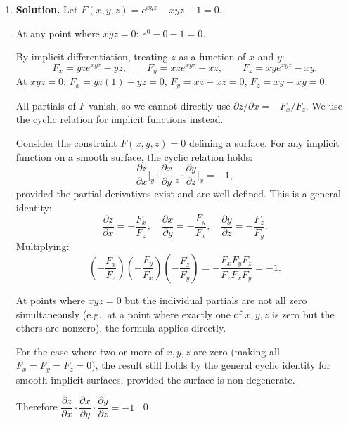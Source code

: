 \begin{enumerate}
\textbf{Second derivative:} Let $y' = \dfrac{2x + y\cos(xy)}{1 - x\cos(xy)}$. Differentiating the original equation $y - x^2 = \sin(xy)$ implicitly again:

$y' - 2x = \cos(xy)(y + xy')$. At $(0,0)$ with $y' = 0$:
$0 - 0 = \cos(0)(0 + 0) = 0$.

Differentiating once more: $y'' - 2 = -\sin(xy)(y+xy')^2 + \cos(xy)(y' + y' + xy'') $.

At $(0,0)$: $y'' - 2 = 0 + \cos(0)(0 + 0 + 0) = 0$.

Therefore $\dfrac{d^2y}{dx^2}\Big|_{(0,0)} = \boxed{2}$.

\item \textbf{Solution.}
Let $F(x,y,z) = e^{xyz} - xyz - 1 = 0$.

At any point where $xyz = 0$: $e^0 - 0 - 1 = 0$.

By implicit differentiation, treating $z$ as a function of $x$ and $y$:
\[
F_x = yze^{xyz} - yz, \qquad F_y = xze^{xyz} - xz, \qquad F_z = xye^{xyz} - xy.
\]
At $xyz = 0$: $F_x = yz(1) - yz = 0$, $F_y = xz - xz = 0$, $F_z = xy - xy = 0$.

All partials of $F$ vanish, so we cannot directly use $\partial z/\partial x = -F_x/F_z$. We use the cyclic relation for implicit functions instead.

Consider the constraint $F(x,y,z)=0$ defining a surface. For any implicit function on a smooth surface, the cyclic relation holds:
\[
\frac{\partial z}{\partial x}\bigg|_y \cdot \frac{\partial x}{\partial y}\bigg|_z \cdot \frac{\partial y}{\partial z}\bigg|_x = -1,
\]
provided the partial derivatives exist and are well-defined. This is a general identity:
\[
\frac{\partial z}{\partial x} = -\frac{F_x}{F_z}, \quad \frac{\partial x}{\partial y} = -\frac{F_y}{F_x}, \quad \frac{\partial y}{\partial z} = -\frac{F_z}{F_y}.
\]
Multiplying:
\[
\left(-\frac{F_x}{F_z}\right)\left(-\frac{F_y}{F_x}\right)\left(-\frac{F_z}{F_y}\right) = -\frac{F_x F_y F_z}{F_z F_x F_y} = -1.
\]

At points where $xyz = 0$ but the individual partials are not all zero simultaneously (e.g., at a point where exactly one of $x,y,z$ is zero but the others are nonzero), the formula applies directly.

For the case where two or more of $x,y,z$ are zero (making all $F_x = F_y = F_z = 0$), the result still holds by the general cyclic identity for smooth implicit surfaces, provided the surface is non-degenerate.

Therefore $\dfrac{\partial z}{\partial x}\cdot\dfrac{\partial x}{\partial y}\cdot\dfrac{\partial y}{\partial z} = -1$. \qed


\end{enumerate}
